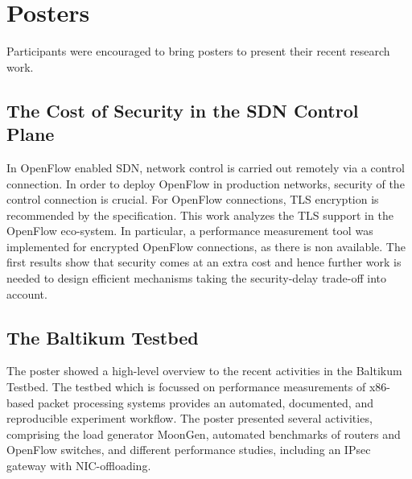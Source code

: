 \section{Posters}\label{sec:posters}

Participants were encouraged to bring posters to present 
their recent research work.

\subsection{The Cost of Security in the SDN Control Plane}

In OpenFlow enabled \ac{SDN}, network control is carried out remotely via a
control connection. In order to deploy OpenFlow in production networks,
security of the control connection is crucial. For OpenFlow connections, TLS
encryption is recommended by the specification. This work
\cite{wkellerer:conext:2015} analyzes the TLS support in the OpenFlow
eco-system. In particular, a performance measurement tool was implemented for
encrypted OpenFlow connections, as there is non available. The first results
show that security comes at an extra cost and hence further work is needed to
design efficient mechanisms taking the security-delay trade-off into account.


\subsection{The Baltikum Testbed}

The poster showed a high-level overview to the recent activities in the
Baltikum Testbed. The testbed which is focussed on performance measurements of
x86-based packet processing systems provides an automated, documented, and
reproducible experiment workflow. The poster presented several activities,
comprising the load generator MoonGen, automated benchmarks of routers and
OpenFlow switches, and different performance studies, including an IPsec
gateway with NIC-offloading.

